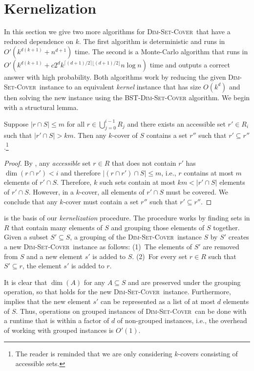 \documentclass[ccfonts,lotsofwhite]{patmorin}
\newcommand{\setcover}{\textsc{Dim-Set-Cover}}
\newcommand{\exponent}{\lceil(d+1)/2\rceil\lfloor(d+1)/2\rfloor}
\newcommand{\runtime}{k^{d(k+1)}+c2^dk^{\exponent}n\log n}
\begin{document}
\section{Kernelization}

In this section we give two more algorithms for \setcover\ that have a
reduced dependence on $k$.  The first algorithm is deterministic and
runs in $O'(k^{d(k+1)}+n^{d+1})$ time.  The second is a Monte-Carlo
algorithm that runs in $O'(\runtime)$ time and outputs a correct
answer with high probability.  Both algorithms work by reducing the
given \setcover\ instance to an equivalent \emph{kernel} instance that
has size $O(k^d)$ and then solving the new instance using the
\textsc{BST-\setcover} algorithm. We begin with a structural lemma.

\begin{lem}
Suppose $|r\cap S|\le m$ for all $r\in \bigcup_{j=0}^{i-1} R_j$ and
there exists an accessible set $r'\in R_i$ such that $|r'\cap S|>km$.
Then any $k$-cover of $S$ contains a set $r''$ such that $r'\subseteq
r''$.\footnote{The reader is reminded that we are only considering
$k$-covers consisting of accessible sets.}
\end{lem}

\begin{proof}
By , any \emph{accessible} set $r\in R$ that
does not contain $r'$ has $\dim(r\cap r') < i$ and therefore $|(r\cap
r')\cap S|\le m$, i.e., $r$ contains at most $m$ elements of $r'\cap
S$.  Therefore, $k$ such sets contain at most $km<|r'\cap S|$ elements
of $r'\cap S$.  However, in a $k$-cover, all elements of $r'\cap S$
must be covered.  We conclude that any $k$-cover must contain a set
$r''$ such that $r'\subseteq r''$.
\end{proof}

 is the basis of our \emph{kernelization}
procedure.  The procedure works by finding sets in $R$ that contain
many elements of $S$ and grouping those elements of $S$ together.
Given a subset $S'\subseteq S$, a grouping of the \setcover\ instance
$S$ by $S'$ creates a new \setcover\ instance as follows: (1)~The
elements of $S'$ are removed from $S$ and a new element $s'$ is added
to $S$.  (2)~For every set $r\in R$ such that $S'\subseteq r$, the
element $s'$ is added to $r$.  

It is clear that $\dim(A)$ for any $A\subseteq S$ and
 are preserved under the grouping operation, so
that  holds for the new \setcover\ instance.
Furthermore,  implies that the new element $s'$ can be
represented as a list of at most $d$ elements of $S$.  Thus,
operations on grouped instances of \setcover\ can be done with a
runtime that is within a factor of $d$ of non-grouped instances, i.e.,
the overhead of working with grouped instances is $O'(1)$.
\end{document}
